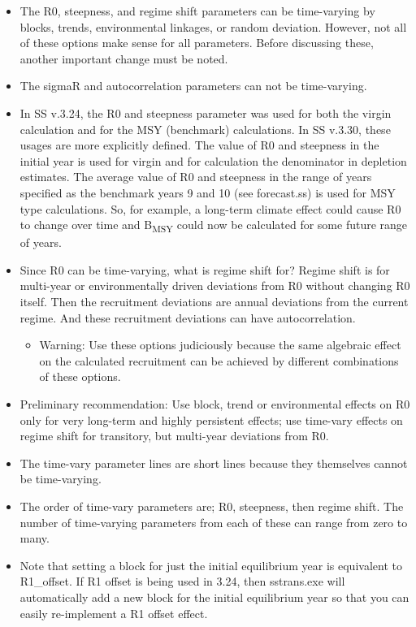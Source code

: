 \begin{itemize}
	\item 	The R0, steepness, and regime shift parameters can be time-varying by blocks, trends, environmental linkages, or random deviation.  However, not all of these options make sense for all parameters.  Before discussing these, another important change must be noted.
	
	\item The sigmaR and autocorrelation parameters can not be time-varying. 
	
	\item In SS v.3.24, the R0 and steepness parameter was used for both the virgin calculation and for the MSY (benchmark) calculations.  In SS v.3.30, these usages are more explicitly defined.  The value of R0 and steepness in the initial year is used for virgin and for calculation the denominator in depletion estimates.  The average value of R0 and steepness in the range of years specified as the benchmark years 9 and 10 (see forecast.ss) is used for MSY type calculations.  So, for example, a long-term climate effect could cause R0 to change over time and B\textsubscript{MSY} could now be calculated for some future range of years.
	
	\item Since R0 can be time-varying, what is regime shift for?  Regime shift is for multi-year or environmentally driven deviations from R0 without changing R0 itself.  Then the recruitment deviations are annual deviations from the current regime.  And these recruitment deviations can have autocorrelation.
	
	\begin{itemize}
		\item Warning: Use these options judiciously because the same algebraic effect on the calculated recruitment can be achieved by different combinations of these options.
	\end{itemize}
	
	\item Preliminary recommendation:  Use block, trend or environmental effects on R0 only for very long-term and highly persistent effects; use time-vary effects on regime shift for transitory, but multi-year deviations from R0.
	
	\item The time-vary parameter lines are short lines because they themselves cannot be time-varying.
	
	\item The order of time-vary parameters are; R0,  steepness, then regime shift.  The number of time-varying parameters from each of these can range from zero to many. 

	\item Note that setting a block for just the initial equilibrium year is equivalent to R1\_offset.  If R1 offset is being used in 3.24, then sstrans.exe will automatically add a new block for the initial equilibrium year so that you can easily re-implement a R1 offset effect.
\end{itemize}


